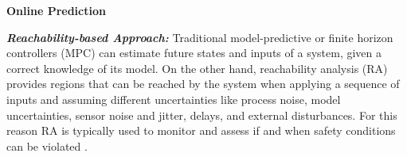 \vspace{10pt}
\noindent\textbf{Online Prediction}

\noindent\textbf{\em Reachability-based Approach:} Traditional model-predictive or finite horizon controllers (MPC) \cite{bernardini2012stabilizing, elnaggar17AHS, bezzo2016stochastic} can estimate future states and inputs of a system, given a correct knowledge of its model. On the other hand, reachability analysis (RA) \cite{TomlinRAM11, TomlinICRA11, esen18} provides regions that can be reached by the system when applying a sequence of inputs and assuming different uncertainties like process noise, model uncertainties, sensor noise and jitter, delays, and external disturbances. For this reason RA is typically used to monitor and assess if and when safety conditions can be violated \cite{gillula2011applications, gillula2010design, althoff2010reachability}.

